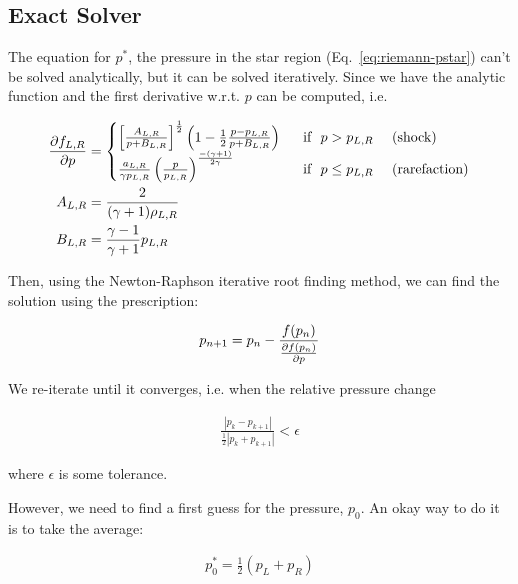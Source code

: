 \subsection{Exact Solver}\label{chap:riemann-exact}


The equation for $p^*$, the pressure in the star region
(Eq.~\ref{eq:riemann-pstar}) can't be solved analytically, but it can be solved
iteratively. Since we have the analytic function and the first derivative
w.r.t. $p$ can be computed, i.e.

\begin{align}
\frac{\partial f_{L,R}}{\partial p} &=
	\begin{cases}
		\left[
			\frac{A_{L,R}}{p + B_{L,R}}
		\right]^{\frac{1}{2}}
		\left(
			1 - \frac{1}{2} \frac{p - p_{L,R}}{p + B_{L,R}}
		\right)
	& ~\text{ if } ~ p > p_{L,R} ~ \quad \text{(shock)} \\
		\frac{a_{L,R}}{\gamma p_{L,R}}
		\left(
			\frac{p}{p_{L,R}}
		\right)^ \frac{-(\gamma+1)}{2 \gamma}
	& ~\text{ if } ~ p \leq p_{L,R} ~ \quad \text{(rarefaction)}
\label{eq:riemann-pstar-dp}\\
		\end{cases} \\
A_{L,R} &=
	\frac{2}{(\gamma + 1) \rho_{L,R}}\\
B_{L,R} &=
	\frac{\gamma - 1}{\gamma + 1} p_{L,R}
\end{align}


Then, using the Newton-Raphson iterative root finding method, we can find the
solution using the prescription:

\begin{align}
	p_{n+1} = p_n - \frac{f(p_n)}{\frac{\partial f(p_n)}{\partial p}}
\end{align}


We re-iterate until it converges, i.e. when the relative pressure change

\begin{align}
	\frac{|p_k - p_{k+1}|}{\frac{1}{2} | p_k + p_{k+1} | } < \epsilon
\end{align}

where $\epsilon$ is some tolerance.


However, we need to find a first guess for the pressure, $p_0$.
An okay way to do it is to take the average:

\begin{align}
	p_0^* = \frac{1}{2} (p_L + p_R)
\end{align}


